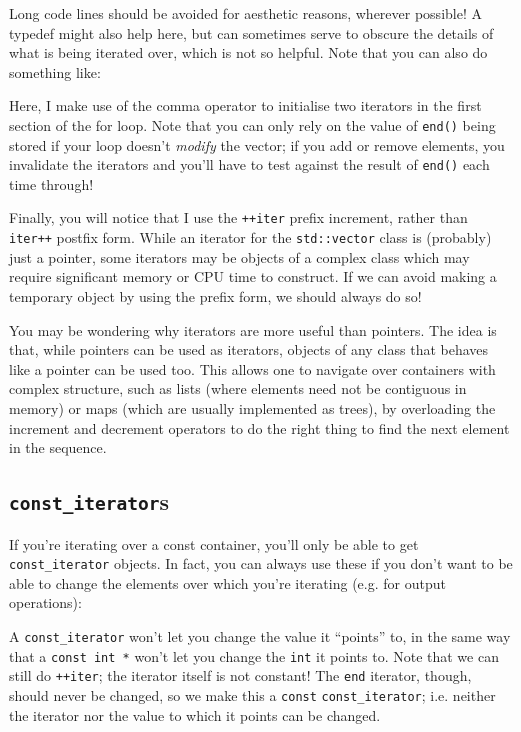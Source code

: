 \documentclass[a4paper]{scrartcl}
\begin{document}


Long code lines should be avoided for aesthetic reasons, wherever possible! A typedef might also help here, but can sometimes serve to obscure the details of what is being iterated over, which is not so helpful. Note that you can also do something like:



Here, I make use of the comma operator to initialise two iterators in the first section of the for loop. Note that you can only rely on the value of \verb|end()| being stored if your loop doesn't \emph{modify} the vector; if you add or remove elements, you invalidate the iterators and you'll have to test against the result of \verb|end()| each time through!

Finally, you will notice that I use the \verb|++iter| prefix increment, rather than \verb|iter++| postfix form. While an iterator for the \verb|std::vector| class is (probably) just a pointer, some iterators may be objects of a complex class which may require significant memory or CPU time to construct. If we can avoid making a temporary object by using the prefix form, we should always do so!

You may be wondering why iterators are more useful than pointers. The idea is that, while pointers can be used as iterators, objects of any class that behaves like a pointer can be used too. This allows one to navigate over containers with complex structure, such as lists (where elements need not be contiguous in memory) or maps (which are usually implemented as trees), by overloading the increment and decrement operators to do the right thing to find the next element in the sequence.

\subsection{\texttt{const\_iterator}s}
If you're iterating over a const container, you'll only be able to get \verb|const_iterator| objects. In fact, you can always use these if you don't want to be able to change the elements over which you're iterating (e.g. for output operations):



A \verb|const_iterator| won't let you change the value it ``points'' to, in the same way that a \verb|const int *| won't let you change the \verb|int| it points to. Note that we can still do \verb|++iter|; the iterator itself is not constant! The \verb|end| iterator, though, should never be changed, so we make this a \verb|const| \verb|const_iterator|; i.e. neither the iterator nor the value to which it points can be changed.
\end{document}
